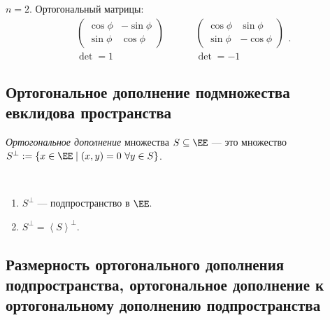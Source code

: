 \begin{example}
    $n = 2$.
    Ортогональный матрицы:
    \begin{equation}
        \begin{gathered}
            \begin{pmatrix} 
                \cos \phi & -\sin \phi \\
                \sin \phi & \cos \phi
            \end{pmatrix} \\
            \det = 1
        \end{gathered}
        \hspace{1cm}
        \begin{gathered}
            \begin{pmatrix} 
                \cos \phi & \sin \phi \\
                \sin \phi & -\cos \phi
            \end{pmatrix} \\
            \det = -1
        \end{gathered}
    .\end{equation}
\end{example}


\subsection{Ортогональное дополнение подмножества евклидова пространства}

\begin{definition}
    \textit{Ортогональное дополнение} множества $S \subseteq \EE$ --- это множество $S^{\perp} := \{x \in \EE \mid (x, y) = 0 \ \forall y \in S\}$.
\end{definition}

\begin{exercise}~
    \begin{enumerate}
    \item $S^{\perp}$ --- подпространство в $\EE$.
    \item $S^{\perp} = \left< S \right>^{\perp}$.
    \end{enumerate}
\end{exercise}


\subsection{Размерность ортогонального дополнения подпространства, ортогональное дополнение к ортогональному дополнению подпространства}
